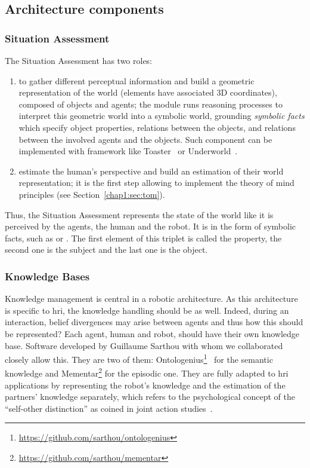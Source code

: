 \documentclass[a4paper,11pt,twoside]{StyleThese}
\begin{document}
\newpage

\subsection{Architecture components}

\subsubsection{Situation Assessment}\label{chap3:subsubsec:sa}
The Situation Assessment has two roles:
\begin{enumerate}
	\item  to gather different perceptual information and build a geometric representation of the world (\ie elements have associated 3D coordinates), composed of objects and agents; the module runs reasoning processes to interpret this geometric world into a symbolic world, grounding \emph{symbolic facts} which specify object properties, relations between the objects, and relations between the involved agents and the objects. Such component can be implemented with framework like Toaster~\cite{milliez_2014_framework} or Underworld~\cite{lemaignan_2018_underworlds}.
	\item estimate the human's perspective and build an estimation of their world representation; it is the first step allowing to implement the theory of mind principles (see Section~\ref{chap1:sec:tom}).
\end{enumerate}

Thus, the Situation Assessment represents the state of the world like it is perceived by the agents, the human and the robot. It is in the form of symbolic facts, such as  or . The first element of this triplet is called the property, the second one is the subject and the last one is the object.

\subsubsection{Knowledge Bases}\label{chap3:subsubsec:kb}

Knowledge management is central in a robotic architecture. As this architecture is specific to \acrshort{hri}, the knowledge handling should be as well. Indeed, during an interaction, belief divergences may arise between agents and thus how this should be represented? Each agent, human and robot, should have their own knowledge base. Software developed by Guillaume Sarthou with whom we collaborated closely allow this. They are two of them: Ontologenius\footnote{\url{https://github.com/sarthou/ontologenius}}~\cite{sarthou_2019_ontologenius} for the semantic knowledge and Mementar\footnote{\url{https://github.com/sarthou/mementar}} for the episodic one. They are fully adapted to \acrshort{hri} applications by representing the robot's knowledge and the estimation of the partners' knowledge separately, which refers to the psychological concept of the ``self-other distinction'' as coined in joint action studies~\cite{pacherie_2012_agency}.  
\end{document}
